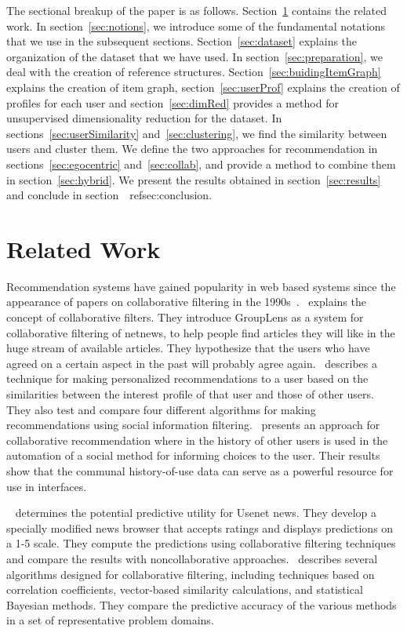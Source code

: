 \documentclass{acm_proc_article-sp}
\begin{document}
The sectional breakup of the paper is as follows. Section~\ref{sec:relatedWork} contains the related work. In section~\ref{sec:notions}, we introduce some of the fundamental notations that we use in the subsequent sections. Section~\ref{sec:dataset} explains the organization of the dataset that we have used. In section~\ref{sec:preparation}, we deal with the creation of reference structures. Section~\ref{sec:buidingItemGraph} explains the creation of item graph, section~\ref{sec:userProf} explains the creation of profiles for each user and section~\ref{sec:dimRed} provides a method for unsupervised dimensionality reduction for the dataset. In sections~\ref{sec:userSimilarity} and~\ref{sec:clustering}, we find the similarity between users and cluster them. We define the two approaches for recommendation in sections~\ref{sec:egocentric} and~\ref{sec:collab}, and provide a method to combine them in section~\ref{sec:hybrid}. We present the results obtained in section~\ref{sec:results} and conclude in section~\
ref{sec:conclusion}.

\section{Related Work}
\label{sec:relatedWork}
Recommendation systems have gained popularity in web based systems since the appearance of papers on collaborative filtering in the 1990s~\cite{resnick, shardanand, hill}.~\cite{resnick} explains the concept of collaborative filters. They introduce GroupLens as a system for collaborative filtering of netnews, to help people find articles they will like in the huge stream of available articles. They hypothesize that the users who have agreed on a certain aspect in the past will probably agree again.~\cite{shardanand} describes a technique for making personalized recommendations to a user based on the similarities between the interest profile of that user and those of other users. They also test and compare four different algorithms for making recommendations using social information filtering.~\cite{hill} presents an approach for collaborative recommendation where in the history of other users is used in the automation of a social method for informing choices to the user. Their results show that the 
communal history-of-use data can serve as a powerful resource for use in interfaces.

~\cite{konstan} determines the potential predictive utility for Usenet news. They develop a specially modified news browser that accepts ratings and displays predictions on a 1-5 scale. They compute the predictions using collaborative filtering techniques and compare the results with noncollaborative approaches.~\cite{breese} describes several algorithms designed for collaborative filtering, including techniques based on correlation coefficients, vector-based similarity calculations, and statistical Bayesian methods. They compare the predictive accuracy of the various methods in a set of representative problem domains.
\end{document}
